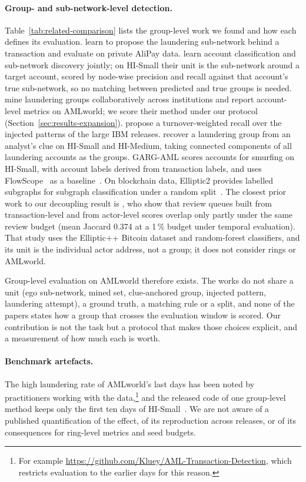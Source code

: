 \paragraph{Group- and sub-network-level detection.}
Table~\ref{tab:related-comparison} lists the group-level work we found and how each defines
its evaluation. \citet{chai2023} learn to propose the laundering sub-network behind a
transaction and evaluate on private AliPay data. \citet{rico2026} learn account classification
and sub-network discovery jointly; on HI-Small their unit is the sub-network around a target
account, scored by node-wise precision and recall against that account's true sub-network, so
no matching between predicted and true groups is needed. \citet{tian2025} mine laundering
groups collaboratively across institutions and report account-level metrics on AMLworld; we
score their method under our protocol (Section~\ref{sec:results-expansion}).
\citet{tariq2026redirect} propose a turnover-weighted recall over the injected patterns of
the large IBM releases. \citet{wang2026clue} recover a laundering group from an analyst's clue
on HI-Small and HI-Medium, taking connected components of all laundering accounts as the
groups. GARG-AML scores accounts for smurfing on HI-Small, with account labels derived from
transaction labels, and uses FlowScope~\citep{li2020flowscope} as a
baseline~\citep{deprez2025garg}. On blockchain data, Elliptic2 provides labelled subgraphs for
subgraph classification under a random split~\citep{bellei2024,song2024revtrack}.
The closest prior work to our decoupling result is \citet{malik2026queues}, who show that
review queues built from transaction-level and from actor-level scores overlap only partly
under the same review budget (mean Jaccard 0.374 at a 1\,\% budget under temporal evaluation). That study uses the Elliptic++ Bitcoin dataset and random-forest classifiers,
and its unit is the individual actor address, not a group; it does not consider rings or
AMLworld.



Group-level evaluation on AMLworld therefore exists. The works do not share a unit (ego
sub-network, mined set, clue-anchored group, injected pattern, laundering attempt), a ground
truth, a matching rule or a split, and none of the papers states how a group that crosses
the evaluation window is scored. Our contribution is not the task but a protocol that makes
those choices explicit, and a measurement of how much each is worth.

\paragraph{Benchmark artefacts.}
The high laundering rate of AMLworld's last days has been noted by practitioners working with
the data,\footnote{For example \url{https://github.com/Kluey/AML-Transaction-Detection}, which
restricts evaluation to the earlier days for this reason.} and the released code of one
group-level method keeps only the first ten days of HI-Small~\citep{rico2026}. We are not
aware of a published quantification of the effect, of its reproduction across releases, or
of its consequences for ring-level metrics and seed budgets.

